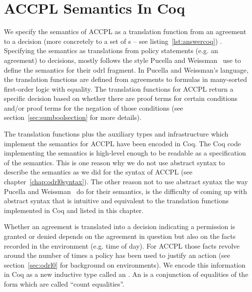 \chapter{ACCPL Semantics In Coq}\label{chap:accplsemanticscoq}

We specify the semantics of \ac{ACCPL} as a translation function from an agreement to a decision (more concretely to a set of s -- see listing~\ref{lst:answercoq}) . Specifying the semantics as translations from policy statements (e.g. an agreement) to decisions, mostly follows the style Pucella and Weissman~\cite{pucella2006} use to define the semantics for their \ac{odrl} fragment. In Pucella and Weissman's language, the translation functions are defined from agreements to formulas in many-sorted first-order logic with equality. The translation functions for \ac{ACCPL} return a specific decision based on whether there are proof terms for certain conditions and/or proof terms for the negation of those conditions (see section~\ref{sec:sumboolsection} for more details).
 

The translation functions plus the auxiliary types and infrastructure which implement the semantics for \ac{ACCPL} have been encoded in Coq. The Coq code implementing the semantics is high-level enough to be readable as a specification of the semantics. This is one reason why we do not use abstract syntax to describe the semantics as we did for the syntax of \ac{ACCPL} (see chapter~\ref{chap:odrl0syntax}). The other reason not to use abstract syntax the way Pucella and Weissman~\cite{pucella2006} do for their semantics, is the difficulty of coming up with abstract syntax that is intuitive and equivalent to the translation functions implemented in Coq and listed in this chapter.

Whether an agreement is translated into a decision indicating a permission is granted or denied depends on the agreement in question but also on the facts recorded in the environment (e.g. time of day). For \ac{ACCPL} those facts revolve around the number of times a policy has been used to justify an action (see section~\ref{sec:odrl0} for background on environments). We encode this information in Coq as a new inductive type called an . An  is a conjunction of equalities of the form  which are called ``count equalities''.

